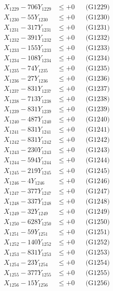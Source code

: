 \documentclass[a4paper,10pt]{article}
\begin{document}
{\begin{align}
X_{1229} - 706Y_{1229} &\leq +0 && \text{(G1229)} \\
X_{1230} - 55Y_{1230} &\leq +0 && \text{(G1230)} \\
\allowbreak
X_{1231} - 317Y_{1231} &\leq +0 && \text{(G1231)} \\
X_{1232} - 391Y_{1232} &\leq +0 && \text{(G1232)} \\
X_{1233} - 155Y_{1233} &\leq +0 && \text{(G1233)} \\
X_{1234} - 108Y_{1234} &\leq +0 && \text{(G1234)} \\
X_{1235} - 74Y_{1235} &\leq +0 && \text{(G1235)} \\
X_{1236} - 27Y_{1236} &\leq +0 && \text{(G1236)} \\
X_{1237} - 831Y_{1237} &\leq +0 && \text{(G1237)} \\
X_{1238} - 713Y_{1238} &\leq +0 && \text{(G1238)} \\
X_{1239} - 831Y_{1239} &\leq +0 && \text{(G1239)} \\
X_{1240} - 487Y_{1240} &\leq +0 && \text{(G1240)} \\
\allowbreak
X_{1241} - 831Y_{1241} &\leq +0 && \text{(G1241)} \\
X_{1242} - 831Y_{1242} &\leq +0 && \text{(G1242)} \\
X_{1243} - 230Y_{1243} &\leq +0 && \text{(G1243)} \\
X_{1244} - 594Y_{1244} &\leq +0 && \text{(G1244)} \\
X_{1245} - 219Y_{1245} &\leq +0 && \text{(G1245)} \\
X_{1246} - 4Y_{1246} &\leq +0 && \text{(G1246)} \\
X_{1247} - 377Y_{1247} &\leq +0 && \text{(G1247)} \\
X_{1248} - 337Y_{1248} &\leq +0 && \text{(G1248)} \\
X_{1249} - 32Y_{1249} &\leq +0 && \text{(G1249)} \\
X_{1250} - 628Y_{1250} &\leq +0 && \text{(G1250)} \\
\allowbreak
X_{1251} - 59Y_{1251} &\leq +0 && \text{(G1251)} \\
X_{1252} - 140Y_{1252} &\leq +0 && \text{(G1252)} \\
X_{1253} - 831Y_{1253} &\leq +0 && \text{(G1253)} \\
X_{1254} - 23Y_{1254} &\leq +0 && \text{(G1254)} \\
X_{1255} - 377Y_{1255} &\leq +0 && \text{(G1255)} \\
X_{1256} - 15Y_{1256} &\leq +0 && \text{(G1256)} \\

\end{align}}
\end{document}
